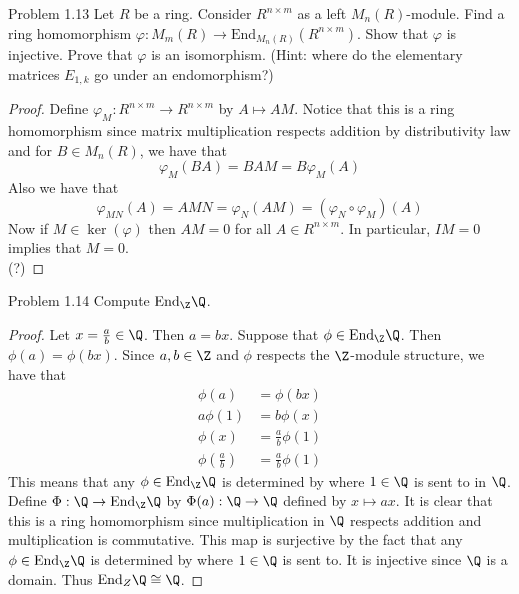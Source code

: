 \documentclass[a4paper]{article}
\begin{document}
\begin{ex}{Problem 1.13}{} Let $R$ be a ring. Consider $R^{n\times m}$ as a left $M_n(R)$-module. Find a ring homomorphism $\varphi:M_m(R)\to\text{End}_{M_n(R)}(R^{n\times m})$. Show that $\varphi$ is injective. Prove that $\varphi$ is an isomorphism. (Hint: where do the elementary matrices $E_{1,k}$ go under an endomorphism?) 
\begin{proof}
Define $\varphi_M:R^{n\times m}\to R^{n\times m}$ by $A\mapsto AM$. Notice that this is a ring homomorphism since matrix multiplication respects addition by distributivity law and for $B\in M_n(R)$, we have that $$\varphi_M(BA)=BAM=B\varphi_M(A)$$ Also we have that $$\varphi_{MN}(A)=AMN=\varphi_N(AM)=(\varphi_N\circ\varphi_M)(A)$$ Now if $M\in\ker(\varphi)$ then $AM=0$ for all $A\in R^{n\times m}$. In particular, $IM=0$ implies that $M=0$. \\

(?)
\end{proof}
\end{ex}

\begin{ex}{Problem 1.14}{} Compute $\text{End}_\Z\Q$. 
\begin{proof}
Let $x=\frac{a}{b}\in\Q$. Then $a=bx$. Suppose that $\phi\in\text{End}_\Z\Q$. Then $\phi(a)=\phi(bx)$. Since $a,b\in\Z$ and $\phi$ respects the $\Z$-module structure, we have that 
\begin{align*}
\phi(a)&=\phi(bx)\\
a\phi(1)&=b\phi(x)\\
\phi(x)&=\frac{a}{b}\phi(1)\\
\phi\left(\frac{a}{b}\right)&=\frac{a}{b}\phi(1)
\end{align*}
This means that any $\phi\in\text{End}_\Z\Q$ is determined by where $1\in\Q$ is sent to in $\Q$. Define $\Phi:\Q\to\text{End}_\Z\Q$ by $\Phi(a):\Q\to\Q$ defined by $x\mapsto ax$. It is clear that this is a ring homomorphism since multiplication in $\Q$ respects addition and multiplication is commutative. This map is surjective by the fact that any $\phi\in\text{End}_\Z\Q$ is determined by where $1\in\Q$ is sent to. It is injective since $\Q$ is a domain. Thus $\text{End}_Z\Q\cong\Q$. 
\end{proof}
\end{ex}
\end{document}
